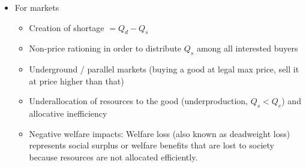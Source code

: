\begin{itemize}
  \item For markets
  \begin{itemize}
    \item Creation of shortage $=Q_d-Q_s$
    \item Non-price rationing in order to distribute $Q_s$ among all interested buyers
    \item Underground / parallel markets (buying a good at legal max price, sell it at price higher than that)
    \item Underallocation of resources to the good (underproduction, $Q_s<Q_e$) and allocative inefficiency
    \item Negative welfare impacts: Welfare loss (also known as deadweight loss) represents social surplus or welfare benefits that are lost to society because resources are not allocated efficiently.


\end{itemize}
\end{itemize}
